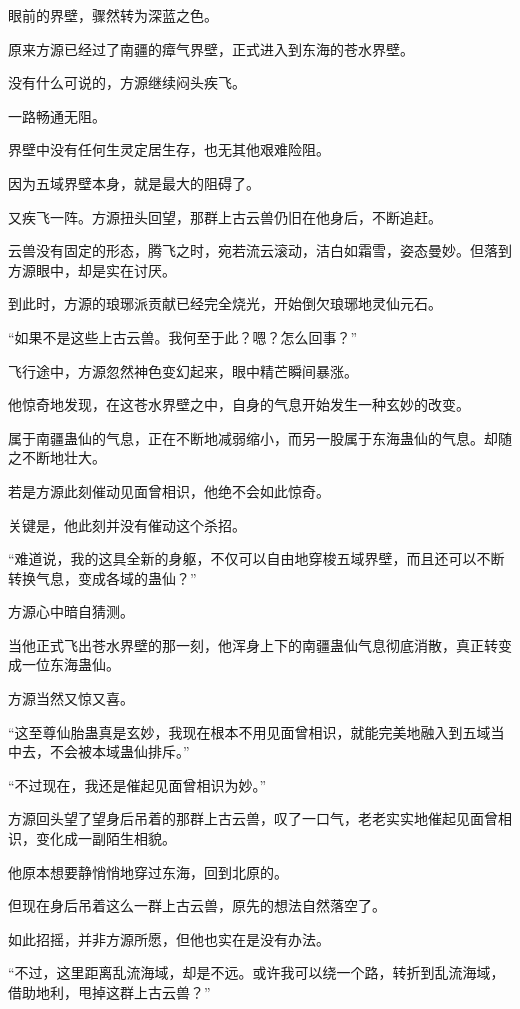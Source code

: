 \begin{this_body}
眼前的界壁，骤然转为深蓝之色。

原来方源已经过了南疆的瘴气界壁，正式进入到东海的苍水界壁。

没有什么可说的，方源继续闷头疾飞。

一路畅通无阻。

界壁中没有任何生灵定居生存，也无其他艰难险阻。

因为五域界壁本身，就是最大的阻碍了。

又疾飞一阵。方源扭头回望，那群上古云兽仍旧在他身后，不断追赶。

云兽没有固定的形态，腾飞之时，宛若流云滚动，洁白如霜雪，姿态曼妙。但落到方源眼中，却是实在讨厌。

到此时，方源的琅琊派贡献已经完全烧光，开始倒欠琅琊地灵仙元石。

“如果不是这些上古云兽。我何至于此？嗯？怎么回事？”

飞行途中，方源忽然神色变幻起来，眼中精芒瞬间暴涨。

他惊奇地发现，在这苍水界壁之中，自身的气息开始发生一种玄妙的改变。

属于南疆蛊仙的气息，正在不断地减弱缩小，而另一股属于东海蛊仙的气息。却随之不断地壮大。

若是方源此刻催动见面曾相识，他绝不会如此惊奇。

关键是，他此刻并没有催动这个杀招。

“难道说，我的这具全新的身躯，不仅可以自由地穿梭五域界壁，而且还可以不断转换气息，变成各域的蛊仙？”

方源心中暗自猜测。

当他正式飞出苍水界壁的那一刻，他浑身上下的南疆蛊仙气息彻底消散，真正转变成一位东海蛊仙。

方源当然又惊又喜。

“这至尊仙胎蛊真是玄妙，我现在根本不用见面曾相识，就能完美地融入到五域当中去，不会被本域蛊仙排斥。”

“不过现在，我还是催起见面曾相识为妙。”

方源回头望了望身后吊着的那群上古云兽，叹了一口气，老老实实地催起见面曾相识，变化成一副陌生相貌。

他原本想要静悄悄地穿过东海，回到北原的。

但现在身后吊着这么一群上古云兽，原先的想法自然落空了。

如此招摇，并非方源所愿，但他也实在是没有办法。

“不过，这里距离乱流海域，却是不远。或许我可以绕一个路，转折到乱流海域，借助地利，甩掉这群上古云兽？”


\end{this_body}
